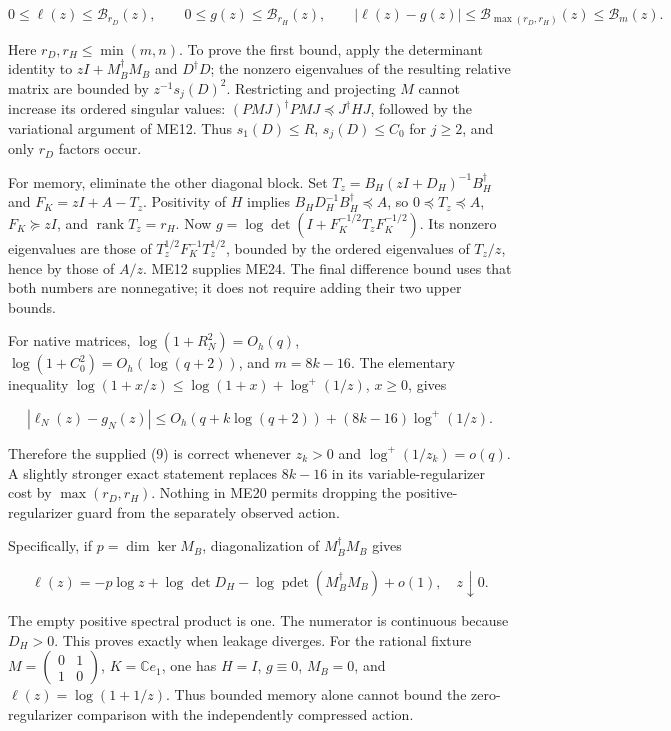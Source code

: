 \documentclass[11pt]{article}
\begin{document}
\[
\boxed{0\le\ell(z)\le\mathcal B_{r_D}(z),\qquad
0\le g(z)\le\mathcal B_{r_H}(z),\qquad
|\ell(z)-g(z)|\le\mathcal B_{\max(r_D,r_H)}(z)\le\mathcal B_m(z).}
\tag{ME24}
\]

Here \(r_D,r_H\le\min(m,n)\). To prove the first bound, apply the determinant identity to \(zI+M_B^\dagger M_B\) and \(D^\dagger D\); the nonzero eigenvalues of the resulting relative matrix are bounded by \(z^{-1}s_j(D)^2\). Restricting and projecting \(M\) cannot increase its ordered singular values: \((PMJ)^\dagger PMJ\preceq J^\dagger HJ\), followed by the variational argument of ME12. Thus \(s_1(D)\le R\), \(s_j(D)\le C_0\) for \(j\ge2\), and only \(r_D\) factors occur.

For memory, eliminate the other diagonal block. Set \(T_z=B_H(zI+D_H)^{-1}B_H^\dagger\) and \(F_K=zI+A-T_z\). Positivity of \(H\) implies \(B_HD_H^{-1}B_H^\dagger\preceq A\), so \(0\preceq T_z\preceq A\), \(F_K\succeq zI\), and \(\operatorname{rank}T_z=r_H\). Now \(g=\log\det(I+F_K^{-1/2}T_zF_K^{-1/2})\). Its nonzero eigenvalues are those of \(T_z^{1/2}F_K^{-1}T_z^{1/2}\), bounded by the ordered eigenvalues of \(T_z/z\), hence by those of \(A/z\). ME12 supplies ME24. The final difference bound uses that both numbers are nonnegative; it does not require adding their two upper bounds.

For native matrices, \(\log(1+R_N^2)=O_h(q)\), \(\log(1+C_0^2)=O_h(\log(q+2))\), and \(m=8k-16\). The elementary inequality \(\log(1+x/z)\le\log(1+x)+\log^+(1/z)\), \(x\ge0\), gives

\[
|\ell_N(z)-g_N(z)|\le O_h(q+k\log(q+2))+(8k-16)\log^+(1/z).
\tag{ME25}
\]

Therefore the supplied (9) is correct whenever \(z_k>0\) and \(\log^+(1/z_k)=o(q)\). A slightly stronger exact statement replaces \(8k-16\) in its variable-regularizer cost by \(\max(r_D,r_H)\). Nothing in ME20 permits dropping the positive-regularizer guard from the separately observed action.

Specifically, if \(p=\dim\ker M_B\), diagonalization of \(M_B^\dagger M_B\) gives

\[
\ell(z)=-p\log z+\log\det D_H
 -\log\operatorname{pdet}(M_B^\dagger M_B)+o(1),\quad z\downarrow0.
\tag{ME26}
\]

The empty positive spectral product is one. The numerator is continuous because \(D_H>0\). This proves exactly when leakage diverges. For the rational fixture \(M=\left(\begin{smallmatrix}0&1\\1&0\end{smallmatrix}\right)\), \(K=\mathbb Ce_1\), one has \(H=I\), \(g\equiv0\), \(M_B=0\), and \(\ell(z)=\log(1+1/z)\). Thus bounded memory alone cannot bound the zero-regularizer comparison with the independently compressed action.
\end{document}

